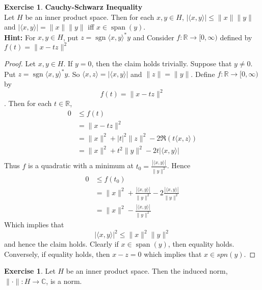 \documentclass[12pt]{amsart}
\theoremstyle{definition}
\newtheorem{ex}[definition]{Exercise}
\newcommand{\C}{\mathbb{C}}
\newcommand{\R}{\mathbb{R}}
\newcommand{\tbf}[1]{\textbf{#1}}
\renewcommand{\r}{\rangle}
\renewcommand{\l}{\langle}
\newcommand{\Rg}{[0,\infty)}
\DeclareMathOperator{\sgn}{sgn}
\DeclareMathOperator{\spn}{span}
\DeclareMathOperator*{\0}{\mbf{0}}
\DeclareMathOperator*{\1}{\mbf{1}}
\newcommand{\lex}[1]{\label{ex:#1}}
\begin{document}
\begin{ex} \lex{} \tbf{Cauchy-Schwarz Inequality}\\
Let $H$ be an inner product space. Then for each $x,y \in H$, $| \l x, y\r | \leq \|x\| \| y\|$ and $| \l x, y\r | = \|x\| \| y\|$ iff $x \in \spn(y)$. \\
\tbf{Hint:} For $x, y \in H$, put $z = \sgn\l x, y \r^*y$ and Consider $f: \R \rightarrow \Rg$ defined by $f(t) = \|x - tz\|^2$
\end{ex}

\begin{proof}
Let $x,y \in H$. If $y = 0$, then the claim holds trivially. Suppose that $y \neq 0$. Put $z = \sgn\l x, y \r^*y$. So $\l x, z\r = |\l x,y \r |$ and $\|z\| = \|y\|$. Define $f: \R \rightarrow \Rg$ by $$f(t) = \|x - tz\|^2$$. Then for each $t \in \R$, 
\begin{align*}
0 
& \leq f(t) \\
&=  \|x - tz\|^2 \\
&= \|x\|^2 + |t|^2\|z\|^2 - 2 \Re(t \l x,z \r) \\
&= \|x\|^2 + t^2\|y\|^2 - 2 t |\l x,y \r| \\
\end{align*} 
Thus $f$ is a quadratic with a minimum at $t_0 = \frac{|\l x, y \r|}{\|y\|^2}$. Hence 
\begin{align*}
0 
&\leq f(t_0) \\
&= \|x\|^2 +  \frac{|\l x, y \r|}{\|y\|^2} - 2\frac{|\l x, y \r|}{\|y\|^2} \\
& = \|x\|^2 -  \frac{|\l x, y \r|}{\|y\|^2}
\end{align*}
Which implies that $$| \l x, y\r |^2 \leq \|x\|^2 \| y\|^2$$ and hence the claim holds. Clearly if $x \in \spn(y)$, then equality holds. Conversely, if equality holds, then $x-z = 0$ which implies that $x \in spn(y)$.
\end{proof}

\begin{ex} \lex{}
Let $H$ be an inner product space. Then the induced norm, $\| \cdot\|: H \rightarrow \C$, is a norm. 
\end{ex}
\end{document}
